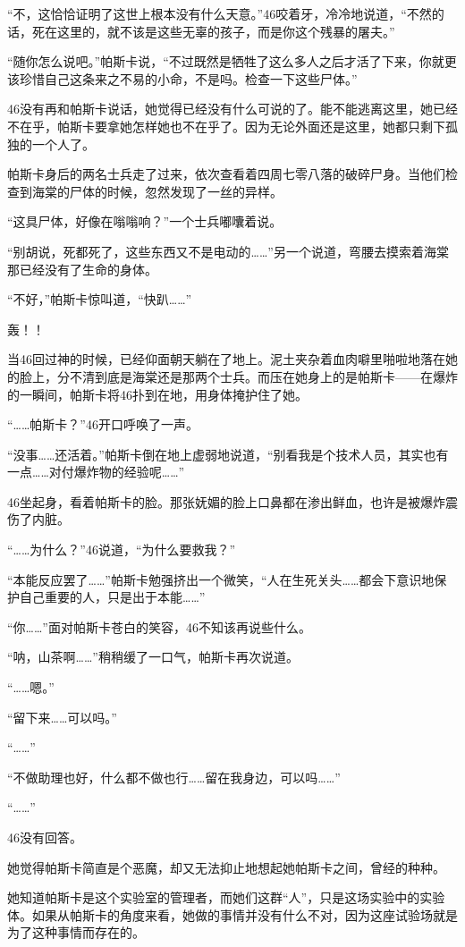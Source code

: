 “不，这恰恰证明了这世上根本没有什么天意。”46咬着牙，冷冷地说道，“不然的话，死在这里的，就不该是这些无辜的孩子，而是你这个残暴的屠夫。”

“随你怎么说吧。”帕斯卡说，“不过既然是牺牲了这么多人之后才活了下来，你就更该珍惜自己这条来之不易的小命，不是吗。检查一下这些尸体。”

46没有再和帕斯卡说话，她觉得已经没有什么可说的了。能不能逃离这里，她已经不在乎，帕斯卡要拿她怎样她也不在乎了。因为无论外面还是这里，她都只剩下孤独的一个人了。

帕斯卡身后的两名士兵走了过来，依次查看着四周七零八落的破碎尸身。当他们检查到海棠的尸体的时候，忽然发现了一丝的异样。

“这具尸体，好像在嗡嗡响？”一个士兵嘟囔着说。

“别胡说，死都死了，这些东西又不是电动的……”另一个说道，弯腰去摸索着海棠那已经没有了生命的身体。

“不好，”帕斯卡惊叫道，“快趴……”

轰！！

当46回过神的时候，已经仰面朝天躺在了地上。泥土夹杂着血肉噼里啪啦地落在她的脸上，分不清到底是海棠还是那两个士兵。而压在她身上的是帕斯卡——在爆炸的一瞬间，帕斯卡将46扑到在地，用身体掩护住了她。

“……帕斯卡？”46开口呼唤了一声。

“没事……还活着。”帕斯卡倒在地上虚弱地说道，“别看我是个技术人员，其实也有一点……对付爆炸物的经验呢……”

46坐起身，看着帕斯卡的脸。那张妩媚的脸上口鼻都在渗出鲜血，也许是被爆炸震伤了内脏。

“……为什么？”46说道，“为什么要救我？”

“本能反应罢了……”帕斯卡勉强挤出一个微笑，“人在生死关头……都会下意识地保护自己重要的人，只是出于本能……”

“你……”面对帕斯卡苍白的笑容，46不知该再说些什么。

“呐，山茶啊……”稍稍缓了一口气，帕斯卡再次说道。

“……嗯。”

“留下来……可以吗。”

“……”

“不做助理也好，什么都不做也行……留在我身边，可以吗……”

“……”

46没有回答。

她觉得帕斯卡简直是个恶魔，却又无法抑止地想起她帕斯卡之间，曾经的种种。

她知道帕斯卡是这个实验室的管理者，而她们这群“人”，只是这场实验中的实验体。如果从帕斯卡的角度来看，她做的事情并没有什么不对，因为这座试验场就是为了这种事情而存在的。

